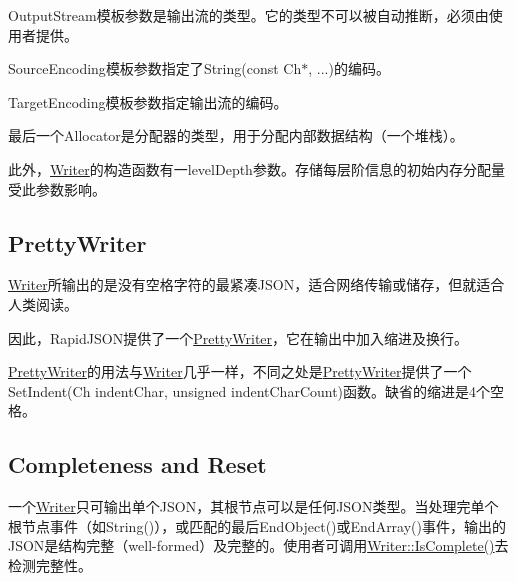{\ttfamily Output\+Stream}模板参数是输出流的类型。它的类型不可以被自动推断，必须由使用者提供。

{\ttfamily Source\+Encoding}模板参数指定了{\ttfamily String(const Ch$\ast$, ...)}的编码。

{\ttfamily Target\+Encoding}模板参数指定输出流的编码。

最后一个{\ttfamily Allocator}是分配器的类型，用于分配内部数据结构（一个堆栈）。

此外，{\ttfamily \hyperlink{class_writer}{Writer}}的构造函数有一{\ttfamily level\+Depth}参数。存储每层阶信息的初始内存分配量受此参数影响。\hypertarget{md_Cadriciel_Commun_Externe_RapidJSON_doc_sax.zh-cn_PrettyWriter}{}\subsection{Pretty\+Writer}\label{md_Cadriciel_Commun_Externe_RapidJSON_doc_sax.zh-cn_PrettyWriter}
{\ttfamily \hyperlink{class_writer}{Writer}}所输出的是没有空格字符的最紧凑\+J\+S\+O\+N，适合网络传输或储存，但就适合人类阅读。

因此，\+Rapid\+J\+S\+O\+N提供了一个{\ttfamily \hyperlink{class_pretty_writer}{Pretty\+Writer}}，它在输出中加入缩进及换行。

{\ttfamily \hyperlink{class_pretty_writer}{Pretty\+Writer}}的用法与{\ttfamily \hyperlink{class_writer}{Writer}}几乎一样，不同之处是{\ttfamily \hyperlink{class_pretty_writer}{Pretty\+Writer}}提供了一个{\ttfamily Set\+Indent(\+Ch indent\+Char, unsigned indent\+Char\+Count)}函数。缺省的缩进是4个空格。\hypertarget{md_Cadriciel_Commun_Externe_RapidJSON_doc_sax.zh-cn_CompletenessReset}{}\subsection{Completeness and Reset}\label{md_Cadriciel_Commun_Externe_RapidJSON_doc_sax.zh-cn_CompletenessReset}
一个{\ttfamily \hyperlink{class_writer}{Writer}}只可输出单个\+J\+S\+O\+N，其根节点可以是任何\+J\+S\+O\+N类型。当处理完单个根节点事件（如{\ttfamily String()}），或匹配的最后{\ttfamily End\+Object()}或{\ttfamily End\+Array()}事件，输出的\+J\+S\+O\+N是结构完整（well-\/formed）及完整的。使用者可调用{\ttfamily \hyperlink{class_writer_aced42429d1b31a565c5ca0310bf4e276}{Writer\+::\+Is\+Complete()}}去检测完整性。

